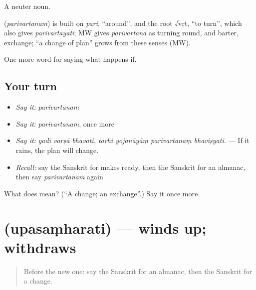 A neuter noun.

\begin{cousinweb}
\textbf{} (\emph{parivartanam}) is built on \emph{pari}, \textquotedblleft{}around\textquotedblright{}, and the root √vṛt, \textquotedblleft{}to turn\textquotedblright{}, which also gives \emph{parivartayati}; MW gives \emph{parivartana} as turning round, and barter, exchange; \textquotedblleft{}a change of plan\textquotedblright{} grows from these senses (MW).
\end{cousinweb}

\begin{grammarlens}[title={What you've built}]
One more word for saying what happens if.
\end{grammarlens}

\subsection*{Your turn}
\begin{itemize}
\raggedright
  \item \emph{Say it:} \emph{parivartanam}
  \item \emph{Say it:} \emph{parivartanam}, once more
  \item \emph{Say it:} \emph{yadi varṣā bhavati, tarhi yojanāyāṃ parivartanaṃ bhaviṣyati.} — If it rains, the plan will change.
  \item \emph{Recall:} say the Sanskrit for makes ready, then the Sanskrit for an almanac, then say \emph{parivartanam} again
\end{itemize}

\begin{tcolorbox}[breakable,colback=teal!4,colframe=teal!35!black,title={Before you move on}]
What does  mean? (\textquotedblleft{}A change; an exchange\textquotedblright{}.) Say it once more.
\end{tcolorbox}
\section[\texorpdfstring{\sk{उपसंहरति} (upasaṃharati)}{उपसंहरति (upasaṃharati)}]{ (upasaṃharati) — winds up; withdraws}

\label{lesson:SA-C529-upasamharati}



\begin{quote}
Before the new one: say the Sanskrit for an almanac, then the Sanskrit for a change.
\end{quote}

